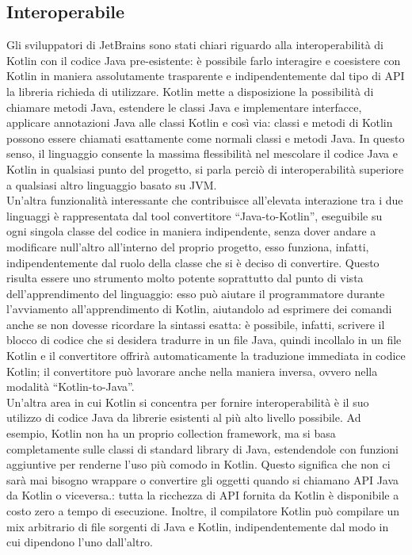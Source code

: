 \subsection{Interoperabile}
Gli sviluppatori di JetBrains sono stati chiari riguardo alla interoperabilità di Kotlin con il codice Java pre-esistente: è possibile farlo interagire e coesistere con Kotlin in maniera assolutamente trasparente e indipendentemente dal tipo di API la libreria richieda di utilizzare. Kotlin mette a disposizione la possibilità di chiamare metodi Java, estendere le classi Java e implementare interfacce, applicare annotazioni Java alle classi Kotlin e così via: classi e metodi di Kotlin possono essere chiamati esattamente come normali classi e metodi Java. In questo senso, il linguaggio consente la massima flessibilità nel mescolare il codice Java e Kotlin in qualsiasi punto del progetto, si parla perciò di interoperabilità superiore a qualsiasi altro linguaggio basato su JVM.\\
Un’altra funzionalità interessante che contribuisce all’elevata interazione tra i due linguaggi è rappresentata dal tool convertitore “Java-to-Kotlin”, eseguibile su ogni singola classe del codice in maniera indipendente, senza dover andare a modificare null’altro all’interno del proprio progetto, esso funziona, infatti, indipendentemente dal ruolo della classe che si è deciso di convertire. Questo risulta essere uno strumento molto potente soprattutto dal punto di vista dell’apprendimento del linguaggio: esso può aiutare il programmatore durante l’avviamento all'apprendimento di Kotlin, aiutandolo ad esprimere dei comandi anche se non dovesse ricordare la sintassi esatta: è possibile, infatti, scrivere il blocco di codice che si desidera tradurre in un file Java, quindi incollalo in un file Kotlin e il convertitore offrirà automaticamente la traduzione immediata in codice Kotlin; il convertitore può lavorare anche nella maniera inversa, ovvero nella modalità “Kotlin-to-Java”.\\
Un'altra area in cui Kotlin si concentra per fornire interoperabilità è il suo utilizzo di codice Java da librerie esistenti al più alto livello possibile. Ad esempio, Kotlin non ha un proprio collection framework, ma si basa completamente sulle classi di standard library di Java, estendendole con funzioni aggiuntive per renderne l’uso più comodo in Kotlin. Questo significa che non ci sarà mai bisogno wrappare o convertire gli oggetti quando si chiamano API Java da Kotlin o viceversa.: tutta la ricchezza di API fornita da Kotlin è disponibile a costo zero a tempo di esecuzione. Inoltre, il compilatore Kotlin può compilare un mix arbitrario di file sorgenti di Java e Kotlin, indipendentemente dal modo in cui dipendono l'uno dall'altro.\\

